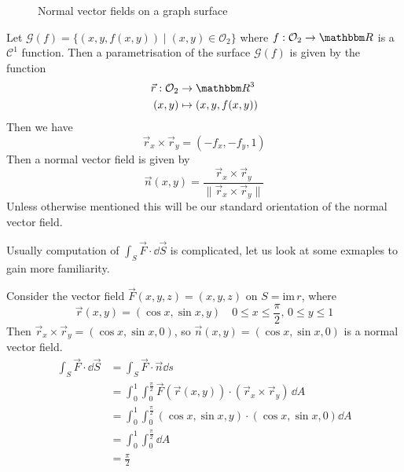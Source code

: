 \documentclass[Analysis-3]{subfiles}
\begin{document}
\begin{Eg}{}{}
    \begin{figure}
        \centering
        \caption{Normal vector fields on a graph surface}
        \label{fig2:27}
    \end{figure}
    Let $\mathcal{G}(f) = \{ (x,y,f(x,y)) \mid (x,y) \in \mathcal{O}_2\}$ where $f : \mathcal{O}_2 \to \R$ is a $\mathscr{C}^1$ function. Then a parametrisation of the surface $\mathcal{G}(f)$ is given by the function 
    \begin{align*}
        \vec{r} : \mathcal{O}_2 &\to \R^3 \\ 
        (x,y) &\mapsto (x,y,f(x,y))
    \end{align*}
    Then we have 
    \[
        \vec{r}_x \times \vec{r}_y = (-f_x, -f_y, 1)    
    \]
    Then a normal vector field is given by 
    \[
        \vec{n}(x,y) = \frac{\vec{r}_x \times \vec{r}_y}{\|\vec{r}_x \times \vec{r}_y \|}    
    \]
    Unless otherwise mentioned this will be our standard orientation of the normal vector field. 
\end{Eg}

Usually computation of $\int_S \vec{F} \cdot \dd \vec{S}$ is complicated, let us look at some exmaples to gain more familiarity. 

\begin{Eg}{}{}
    Consider the vector field $\vec{F}(x,y,z) = (x,y,z)$ on $S = \mathrm{im} \, r$, where 
    \[
        \vec{r}(x,y) = (\cos x, \sin x, y) \quad 0 \leq x \leq \frac{\pi}{2}, \, 0 \leq y \leq 1    
    \]
    Then $\vec{r}_x \times \vec{r}_y = (\cos x, \sin x, 0)$, so $\vec{n}(x,y) = (\cos x, \sin x, 0)$ is a normal vector field. 
    \begin{align*}
        \int_S \vec{F} \cdot \dd \vec{S} &= \int_S \vec{F} \cdot \vec{n} \dd s \\ 
        &= \int_0^1 \int_0^{\frac{\pi}{2}} \vec{F}(\vec{r}(x,y)) \cdot (\vec{r}_x \times \vec{r}_y) \, \dd A \\ 
        &= \int_0^1 \int_0^{\frac{\pi}{2}}  (\cos x, \sin x , y) \cdot (\cos x, \sin x, 0) \dd A \\ 
        &= \int_0^1 \int_{0}^{\frac{\pi}{2}} \dd A \\ 
        &= \frac{\pi}{2} 
    \end{align*}
\end{Eg}
\end{document}
